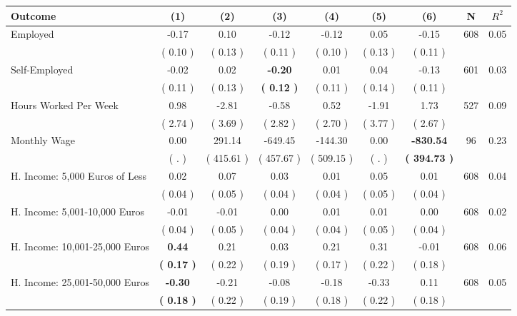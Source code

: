 \begin{tabular}{lcccccccc}
\toprule
 \textbf{Outcome} & \textbf{(1)} & \textbf{(2)} & \textbf{(3)} & \textbf{(4)} & \textbf{(5)} & \textbf{(6)} & \textbf{N} & \textbf{$ R^2$} \\
\midrule
Employed &     -0.17 &      0.10 &     -0.12 &     -0.12 &      0.05 &     -0.15 & 608 &       0.05 \\ 
 & (     0.10 ) & (     0.13 ) & (     0.11 ) & (     0.10 ) & (     0.13 ) & (     0.11 ) & \\
Self-Employed &     -0.02 &      0.02 & \textbf{    -0.20} &      0.01 &      0.04 &     -0.13 & 601 &       0.03 \\ 
 & (     0.11 ) & (     0.13 ) & \textbf{(     0.12 )} & (     0.11 ) & (     0.14 ) & (     0.11 ) & \\
Hours Worked Per Week &      0.98 &     -2.81 &     -0.58 &      0.52 &     -1.91 &      1.73 & 527 &       0.09 \\ 
 & (     2.74 ) & (     3.69 ) & (     2.82 ) & (     2.70 ) & (     3.77 ) & (     2.67 ) & \\
Monthly Wage &      0.00 &    291.14 &   -649.45 &   -144.30 &      0.00 & \textbf{  -830.54} & 96 &       0.23 \\ 
 & (        . ) & (   415.61 ) & (   457.67 ) & (   509.15 ) & (        . ) & \textbf{(   394.73 )} & \\
H. Income: 5,000 Euros of Less &      0.02 &      0.07 &      0.03 &      0.01 &      0.05 &      0.01 & 608 &       0.04 \\ 
 & (     0.04 ) & (     0.05 ) & (     0.04 ) & (     0.04 ) & (     0.05 ) & (     0.04 ) & \\
H. Income: 5,001-10,000 Euros &     -0.01 &     -0.01 &      0.00 &      0.01 &      0.01 &      0.00 & 608 &       0.02 \\ 
 & (     0.04 ) & (     0.05 ) & (     0.04 ) & (     0.04 ) & (     0.05 ) & (     0.04 ) & \\
H. Income: 10,001-25,000 Euros & \textbf{     0.44} &      0.21 &      0.03 &      0.21 &      0.31 &     -0.01 & 608 &       0.06 \\ 
 & \textbf{(     0.17 )} & (     0.22 ) & (     0.19 ) & (     0.17 ) & (     0.22 ) & (     0.18 ) & \\
H. Income: 25,001-50,000 Euros & \textbf{    -0.30} &     -0.21 &     -0.08 &     -0.18 &     -0.33 &      0.11 & 608 &       0.05 \\ 
 & \textbf{(     0.18 )} & (     0.22 ) & (     0.19 ) & (     0.18 ) & (     0.22 ) & (     0.18 ) & \\

\end{tabular}

